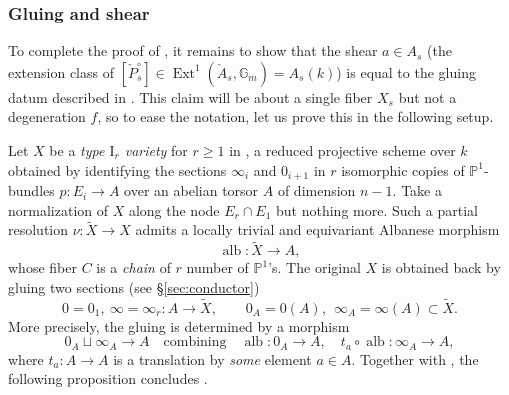 \documentclass[reqno, letterpaper]{amsart}
\numberwithin{equation}{subsection}
\let\to\longrightarrow
\newcommand{\GG}{\mathbb{G}}
\newcommand{\PP}{\mathbb{P}}
\DeclareMathOperator{\Ext}{Ext}
\DeclareMathOperator{\alb}{alb}
\begin{document}
		
		
		\subsubsection{Gluing and shear}
			To complete the proof of , it remains to show that the shear $a \in A_s$ (the extension class of $[\check P_s^\circ] \in \Ext^1 (\check A_s, \GG_m) = A_s(k)$) is equal to the gluing datum described in . This claim will be about a single fiber $X_s$ but not a degeneration $f$, so to ease the notation, let us prove this in the following setup.
			
			\medskip
			
			Let $X$ be a \emph{type $\mathrm I_r$ variety} for $r \ge 1$ in , a reduced projective scheme over $k$ obtained by identifying the sections $\infty_i$ and $0_{i+1}$ in $r$ isomorphic copies of $\PP^1$-bundles $p : E_i \to A$ over an abelian torsor $A$ of dimension $n-1$. Take a normalization of $X$ along the node $E_r \cap E_1$ but nothing more. Such a partial resolution $\nu : \tilde X \to X$ admits a locally trivial and equivariant Albanese morphism
			\[ \alb : \tilde X \to A ,\]
			whose fiber $C$ is a \emph{chain} of $r$ number of $\PP^1$'s. The original $X$ is obtained back by gluing two sections (see \S \ref{sec:conductor})
			\[ 0 = 0_1 , \ \infty = \infty_r : A \to \tilde X, \qquad 0_A = 0(A) , \ \ \infty_A = \infty(A) \subset \tilde X .\]
			More precisely, the gluing is determined by a morphism
			\begin{equation} \label{eq:contraction with shear}
				0_A \sqcup \infty_A \to A \quad\mbox{combining}\quad \alb : 0_A \to A ,\quad t_a \circ \alb : \infty_A \to A ,
			\end{equation}
			where $t_a : A \to A$ is a translation by \emph{some} element $a \in A$. Together with , the following proposition concludes .
			
\end{document}
